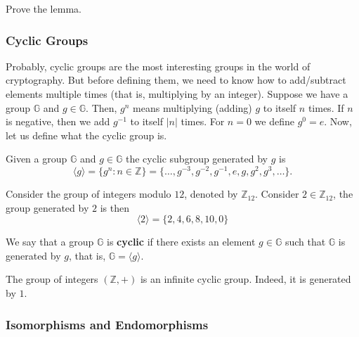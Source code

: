 \documentclass[../lecture-notes.tex]{subfiles}
\begin{document}
\begin{exercise}
    Prove the lemma.
\end{exercise}

\subsubsection{Cyclic Groups}

Probably, cyclic groups are the most interesting groups in the world of cryptography. But before defining them, we need to know how to add/subtract elements multiple times (that is, multiplying by an integer). Suppose 
we have a group $\mathbb{G}$ and $g \in \mathbb{G}$. Then, $g^n$ means multiplying (adding) $g$ to itself $n$ times. If $n$ is negative, then we add $g^{-1}$ to itself $|n|$ times. For $n=0$ we define $g^0 = e$. Now, let us define what the cyclic group is.
\begin{definition}
    Given a group $\mathbb{G}$ and $g \in \mathbb{G}$ the cyclic subgroup generated by $g$ is
    \begin{equation*}
        \langle g \rangle = \{g^n: n \in \mathbb{Z}\} = \{\dots,g^{-3}, g^{-2}, g^{-1}, e, g, g^2, g^3, \dots\}.
    \end{equation*}
\end{definition}

\begin{example}
    Consider the group of integers modulo $12$, denoted by $\mathbb{Z}_{12}$. Consider $2 \in \mathbb{Z}_{12}$, the group generated by $2$ is then
    \begin{equation*}
        \langle 2 \rangle = \{2,4,6,8,10, 0\}
    \end{equation*}
\end{example}

\begin{definition}
    We say that a group $\mathbb{G}$ is \textbf{cyclic} if there exists an element $g \in \mathbb{G}$ such that $\mathbb{G}$ is generated by $g$, that is, $\mathbb{G} = \langle g \rangle$.
\end{definition}

\begin{example}
    The group of integers $(\mathbb{Z},+)$ is an infinite cyclic group. Indeed, it is generated by $1$.
\end{example}

\subsubsection{Isomorphisms and Endomorphisms}
\end{document}
